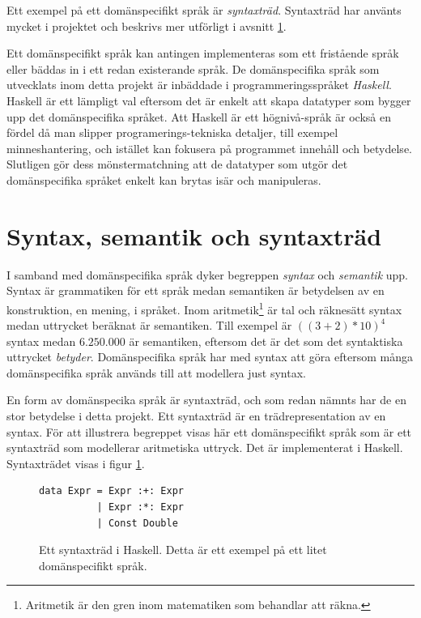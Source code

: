\begin{draft}
Ett exempel på ett domänspecifikt språk är \textit{syntaxträd}. Syntaxträd har använts mycket i projektet och beskrivs mer utförligt i avsnitt \ref{sec:syntax}.

Ett domänspecifikt språk kan antingen implementeras som ett fristående språk eller bäddas in i ett redan existerande språk. De domänspecifika språk som utvecklats inom detta projekt är inbäddade i programmeringsspråket \textit{Haskell}. Haskell är ett lämpligt val eftersom det är enkelt att skapa datatyper som bygger upp det domänspecifika språket. Att Haskell är ett högnivå-språk är också en fördel då man slipper programerings-tekniska detaljer, till exempel minneshantering, och istället kan fokusera på programmet innehåll och betydelse. Slutligen gör dess mönstermatchning att de datatyper som utgör det domänspecifika språket enkelt kan brytas isär och manipuleras.

\section{Syntax, semantik och syntaxträd}
\label{sec:syntax}

I samband med domänspecifika språk dyker begreppen \textit{syntax} och \textit{semantik} upp. Syntax är grammatiken för ett språk medan semantiken är betydelsen av en konstruktion, en mening, i språket. Inom aritmetik\footnote{Aritmetik är den gren inom matematiken som behandlar att räkna.} är tal och räknesätt syntax medan uttrycket beräknat är semantiken. Till exempel är $((3 + 2) * 10)^4$ syntax medan $6.250.000$ är semantiken, eftersom det är det som det syntaktiska uttrycket \textit{betyder}. Domänspecifika språk har med syntax att göra eftersom många domänspecifika språk används till att modellera just syntax.

En form av domänspecika språk är syntaxträd, och som redan nämnts har de en stor betydelse i detta projekt. Ett syntaxträd är en trädrepresentation av en syntax. För att illustrera begreppet visas här ett domänspecifikt språk som är ett syntaxträd som modellerar aritmetiska uttryck. Det är implementerat i Haskell. Syntaxträdet visas i figur \ref{fig:syntax_exempel}.

\begin{figure}[tph]
  \begin{lstlisting}
data Expr = Expr :+: Expr
          | Expr :*: Expr
          | Const Double
  \end{lstlisting}
  \caption{Ett syntaxträd i Haskell. Detta är ett exempel på ett litet domänspecifikt språk.}
  \label{fig:syntax_exempel}
\end{figure}


\end{draft}
